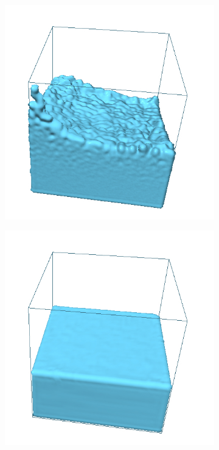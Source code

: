 \begin{figure}[h!]
\begin{subfigure}[t]{.3\textwidth}
	\end{subfigure}
		\begin{subfigure}[t]{.3\textwidth}
			\centering
        	\includegraphics[scale=0.8]{obrazky-figures/app/Simple03.jpg}
	\end{subfigure}%
		\begin{subfigure}[t]{.3\textwidth}
			\centering
        	\includegraphics[scale=0.8]{obrazky-figures/app/Simple04.jpg}
	\end{subfigure}%
	\label{fig:1block}
\end{figure}

